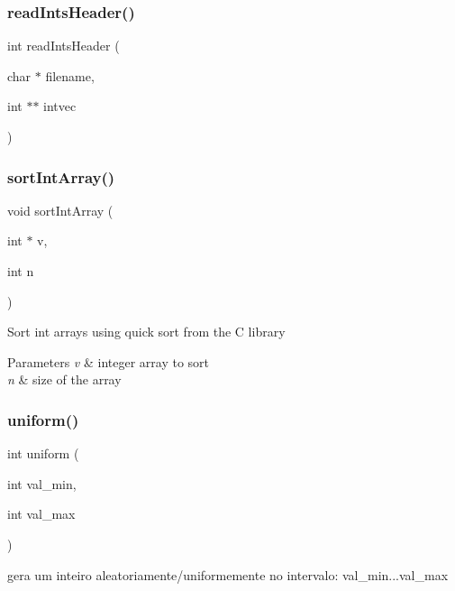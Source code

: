 \subsubsection{read\+Ints\+Header()}
{\footnotesize\ttfamily int read\+Ints\+Header (\begin{DoxyParamCaption}\item[{char $\ast$}]{filename,  }\item[{int $\ast$$\ast$}]{intvec }\end{DoxyParamCaption})}

\label{lib__util_8h_a49ccd6574e920625e550611b866e0061} 
\subsubsection{sort\+Int\+Array()}
{\footnotesize\ttfamily void sort\+Int\+Array (\begin{DoxyParamCaption}\item[{int $\ast$}]{v,  }\item[{int}]{n }\end{DoxyParamCaption})}

Sort int arrays using quick sort from the C library


\begin{DoxyParams}{Parameters}
{\em v} & integer array to sort \\
\hline
{\em n} & size of the array \\
\hline
\end{DoxyParams}
\label{lib__util_8h_a208b2f2e1c8baf599e4dccc30d5cb68c} 
\subsubsection{uniform()}
{\footnotesize\ttfamily int uniform (\begin{DoxyParamCaption}\item[{int}]{val\+\_\+min,  }\item[{int}]{val\+\_\+max }\end{DoxyParamCaption})}



gera um inteiro aleatoriamente/uniformemente no intervalo\+: val\+\_\+min...val\+\_\+max 

\label{lib__util_8h_ae71ab2f0c99295c1d34ca63a0d528582} 
